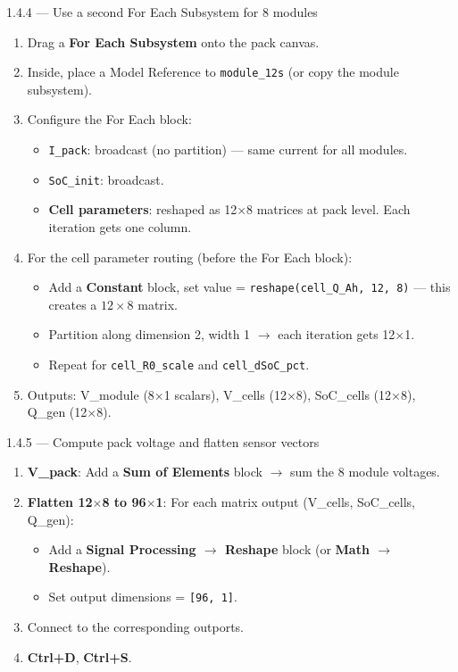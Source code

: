 \documentclass[11pt,a4paper]{article}
\begin{document}
\begin{guistep}{1.4.4 — Use a second For Each Subsystem for 8 modules}
\begin{enumerate}
    \item Drag a \textbf{For Each Subsystem} onto the pack canvas.
    \item Inside, place a Model Reference to \texttt{module\_12s} (or copy the module subsystem).
    \item Configure the For Each block:
    \begin{itemize}
        \item \texttt{I\_pack}: broadcast (no partition) — same current for all modules.
        \item \texttt{SoC\_init}: broadcast.
        \item \textbf{Cell parameters}: reshaped as 12$\times$8 matrices at pack level. Each iteration gets one column.
    \end{itemize}
    \item For the cell parameter routing (before the For Each block):
    \begin{itemize}
        \item Add a \textbf{Constant} block, set value = \texttt{reshape(cell\_Q\_Ah, 12, 8)} — this creates a $12\!\times\!8$ matrix.
        \item Partition along dimension 2, width 1 $\to$ each iteration gets 12$\times$1.
        \item Repeat for \texttt{cell\_R0\_scale} and \texttt{cell\_dSoC\_pct}.
    \end{itemize}
    \item Outputs: V\_module (8$\times$1 scalars), V\_cells (12$\times$8), SoC\_cells (12$\times$8), Q\_gen (12$\times$8).
\end{enumerate}
\end{guistep}

\begin{guistep}{1.4.5 — Compute pack voltage and flatten sensor vectors}
\begin{enumerate}
    \item \textbf{V\_pack}: Add a \textbf{Sum of Elements} block $\to$ sum the 8 module voltages.
    \item \textbf{Flatten 12$\times$8 to 96$\times$1}: For each matrix output (V\_cells, SoC\_cells, Q\_gen):
    \begin{itemize}
        \item Add a \textbf{Signal Processing $\to$ Reshape} block (or \textbf{Math $\to$ Reshape}).
        \item Set output dimensions = \texttt{[96, 1]}.
    \end{itemize}
    \item Connect to the corresponding outports.
    \item \textbf{Ctrl+D}, \textbf{Ctrl+S}.
\end{enumerate}
\end{guistep}
\end{document}
